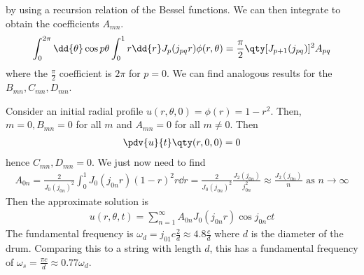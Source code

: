by using a recursion relation of the Bessel functions.
We can then integrate to obtain the coefficients $A_{mn}$.
\begin{align*}
	\int_0^{2\pi} \dd{\theta} \cos p\theta \int_0^1 r \dd{r} J_p(j_{pq} r) \phi(r,\theta) = \frac{\pi}{2}\qty[J_{p+1}(j_{pq})]^2 A_{pq}
\end{align*}
where the $\frac{\pi}{2}$ coefficient is $2\pi$ for $p = 0$.
We can find analogous results for the $B_{mn}, C_{mn}, D_{mn}$.
\begin{example}
	Consider an initial radial profile $u(r,\theta,0) = \phi(r) = 1 - r^2$.
	Then, $m = 0, B_{mn} = 0$ for all $m$ and $A_{mn} = 0$ for all $m \neq 0$.
	Then
	\begin{align*}
		\pdv{u}{t}\qty(r,0,0) = 0
	\end{align*}
	hence $C_{mn}, D_{mn} = 0$.
	We just now need to find
	\begin{align*}
		A_{0n} = \frac{2}{J_0(j_{0n})^2} \int_0^1 J_0(j_{0n}r)(1-r)^2 r\dd{r} = \frac{2}{J_0(j_{0n})^2} \frac{J_2(j_{0n})}{j_{0n}^2} \approx \frac{J_2(j_{0n})}{n} \text{ as } n \to \infty
	\end{align*}
	Then the approximate solution is
	\begin{align*}
		u(r,\theta,t) = \sum_{n=1}^\infty A_{0n} J_0(j_{0n}r)\cos j_{0n} ct
	\end{align*}
	The fundamental frequency is $\omega_d = j_{01} c \frac{2}{d} \approx 4.8\frac{c}{d}$ where $d$ is the diameter of the drum.
	Comparing this to a string with length $d$, this has a fundamental frequency of $\omega_s = \frac{\pi c}{d} \approx 0.77 \omega_d$.
\end{example}

